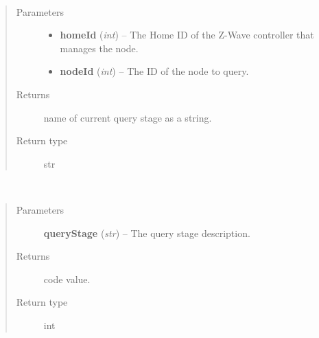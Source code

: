 \documentclass[letterpaper,10pt,english]{sphinxmanual}
\begin{document}
\begin{fulllineitems}
\begin{fulllineitems}
\begin{quote}
\begin{description}
\end{description}\end{quote}

\end{fulllineitems}


\begin{fulllineitems}
\label{libopenzwave:libopenzwave.PyManager.getNodeQueryStage}~\begin{quote}\begin{description}
\item[{Parameters}] \leavevmode\begin{itemize}
\item {} 
\textbf{homeId} (\emph{int}) -- The Home ID of the Z-Wave controller that manages the node.

\item {} 
\textbf{nodeId} (\emph{int}) -- The ID of the node to query.

\end{itemize}

\item[{Returns}] \leavevmode
name of current query stage as a string.

\item[{Return type}] \leavevmode
str

\end{description}\end{quote}

\end{fulllineitems}


\begin{fulllineitems}
\label{libopenzwave:libopenzwave.PyManager.getNodeQueryStageCode}~\begin{quote}\begin{description}
\item[{Parameters}] \leavevmode
\textbf{queryStage} (\emph{str}) -- The query stage description.

\item[{Returns}] \leavevmode
code value.

\item[{Return type}] \leavevmode
int

\end{description}\end{quote}


\end{fulllineitems}
\end{fulllineitems}
\end{document}
